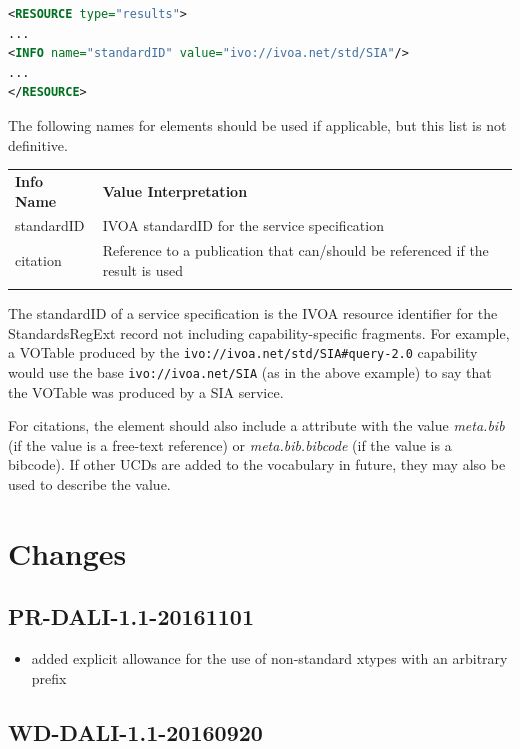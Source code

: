 \documentclass[11pt,letter]{ivoa}
\begin{document}
\begin{lstlisting}[language=XML]
<RESOURCE type="results">
...
<INFO name="standardID" value="ivo://ivoa.net/std/SIA"/>
...
</RESOURCE>
\end{lstlisting}

The following names for  elements should be used if applicable, but this 
list is not definitive.

\begin{tabular}{l p{8cm}}
\sptablerule
\textbf{Info Name}&\textbf{Value Interpretation}\\
\sptablerule
standardID & IVOA standardID for the service specification \\
citation & Reference to a publication that can/should be referenced if the 
result is used \\
\sptablerule
\end{tabular}

The standardID of a service specification is the IVOA resource identifier for 
the StandardsRegExt record not including capability-specific fragments. For example, 
a VOTable produced by the \verb|ivo://ivoa.net/std/SIA#query-2.0| capability 
would use the base \verb|ivo://ivoa.net/SIA| (as in the above example) to say that 
the VOTable was produced by a SIA service.

For citations, the  element should also include a
 attribute with the 
value \emph{meta.bib} (if the value is a free-text reference) or
\emph{meta.bib.bibcode} (if 
the value is a bibcode). If other  UCDs are added to the vocabulary in 
future, they may also be used to describe the value.

\appendix

\section{Changes}

\subsection{PR-DALI-1.1-20161101}

\begin{itemize}
\item added explicit allowance for the use of non-standard xtypes with an 
arbitrary prefix
\end{itemize}

\subsection{WD-DALI-1.1-20160920}
\end{document}
